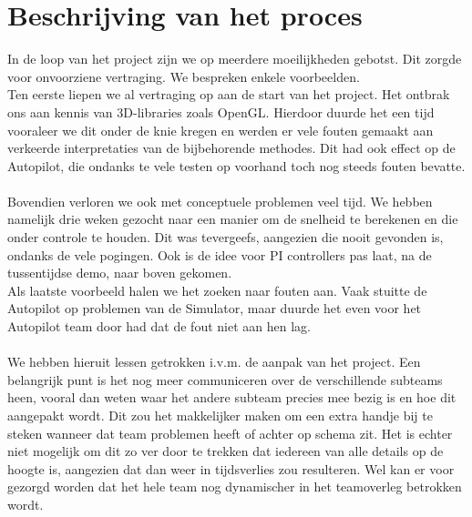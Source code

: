 \documentclass[]{penoverslag}
\begin{document}
\maketitlepage




\newpage\makeappendix

\section{Beschrijving van het proces}
In de loop van het project zijn we op meerdere moeilijkheden gebotst. Dit zorgde voor onvoorziene vertraging. We bespreken enkele voorbeelden.
\\
Ten eerste liepen we al vertraging op aan de start van het project. Het ontbrak ons aan kennis van 3D-libraries zoals OpenGL. Hierdoor duurde het een tijd vooraleer we dit onder de knie kregen en werden er vele fouten gemaakt aan verkeerde interpretaties van de bijbehorende methodes. Dit had ook effect op de Autopilot, die ondanks te vele testen op voorhand toch nog steeds fouten bevatte.
\\
\\
Bovendien verloren we ook met conceptuele problemen veel tijd. We hebben namelijk drie weken gezocht naar een manier om de snelheid te berekenen en die onder controle te houden. Dit was tevergeefs, aangezien die nooit gevonden is, ondanks de vele pogingen. Ook is de idee voor PI controllers pas laat, na de tussentijdse demo, naar boven gekomen.
\\
Als laatste voorbeeld halen we het zoeken naar fouten aan. Vaak stuitte de Autopilot op problemen van de Simulator, maar duurde het even voor het Autopilot team door had dat de fout niet aan hen lag.
\\
\\
We hebben hieruit lessen getrokken i.v.m. de aanpak van het project. 
Een belangrijk punt is het nog meer communiceren over de verschillende subteams heen, vooral dan weten waar het andere subteam precies mee bezig is en hoe dit aangepakt wordt. Dit zou het makkelijker maken om een extra handje bij te steken wanneer dat team problemen heeft of achter op schema zit. Het is echter niet mogelijk om dit zo ver door te trekken dat iedereen van alle details op de hoogte is, aangezien dat dan weer in tijdsverlies zou resulteren. Wel kan er voor gezorgd worden dat het hele team nog dynamischer in het teamoverleg betrokken wordt.
\end{document}

